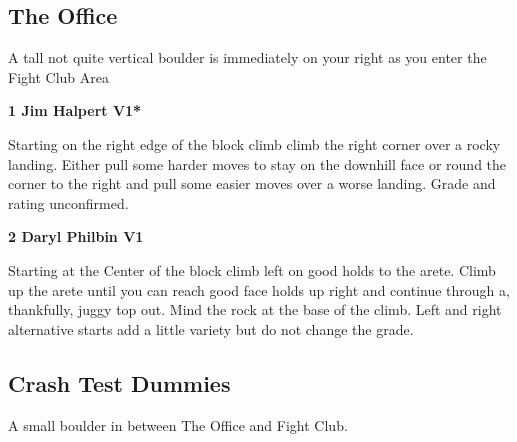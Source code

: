 \begin{multicols}{2}
			\begin{minipage}{\columnwidth}
			\subsection*{The Office}\label{bf:The Office}
			A tall not quite vertical boulder is immediately on your right as you enter the Fight Club Area
			
			\end{minipage}
			
					\begin{minipage}{\linewidth}	
					\label{rt:Jim Halpert}
\colorbox{green!20}{
\parbox{0.95\textwidth}{
\textbf{
1 Jim Halpert V1*  \warn \warn 
}
}
}

					\begin{adjustwidth}{0.5cm}{}				
					Starting on the right edge of the block climb climb the right corner over a rocky landing. Either pull some harder moves to stay on the downhill face or round the corner to the right and pull some easier moves over a worse landing. Grade and rating unconfirmed.
					\end{adjustwidth}
					\end{minipage}

					\begin{minipage}{\linewidth}	
					\label{rt:Daryl Philbin}
\colorbox{green!20}{
\parbox{0.95\textwidth}{
\textbf{
2 Daryl Philbin V1     \warn 
}
}
}

					\begin{adjustwidth}{0.5cm}{}				
					Starting at the Center of the block climb left on good holds to the arete. Climb up the arete until you can reach good face holds up right and continue through a, thankfully, juggy top out. Mind the rock at the base of the climb. Left and right alternative starts add a little variety but do not change the grade.
					\end{adjustwidth}
					\end{minipage}
			\begin{minipage}{\columnwidth}
			\subsection*{Crash Test Dummies}\label{bf:Crash Test Dummies}
			A small boulder in between The Office and Fight Club.
			
			\end{minipage}
			

\end{multicols}
